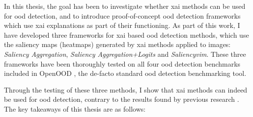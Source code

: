 \documentclass[UKenglish]{uiomasterthesis} %
\theoremstyle{definition}
\begin{document}
In this thesis, the goal has been to investigate whether \ac{xai} methods can be used for \ac{ood} detection, and to introduce proof-of-concept \ac{ood} detection frameworks which use \ac{xai} explanations as part of their functioning. As part of this work, I have developed three frameworks for \ac{xai} based \ac{ood} detection methods, which use the saliency maps (heatmaps) generated by \ac{xai} methods applied to images: {\it Saliency Aggregation}, {\it Saliency Aggregation+Logits} and {\it Saliency\acs*{vim}}. These three frameworks have been thoroughly tested on all four \ac{ood} detection benchmarks included in OpenOOD \cite{openood, openood15}, the de-facto standard \ac{ood} detection benchmarking tool.

Through the testing of these three methods, I show that \ac{xai} methods can indeed be used for \ac{ood} detection, contrary to the results found by previous research \cite{martinez}. The key takeaways of this thesis are as follows:
\end{document}
